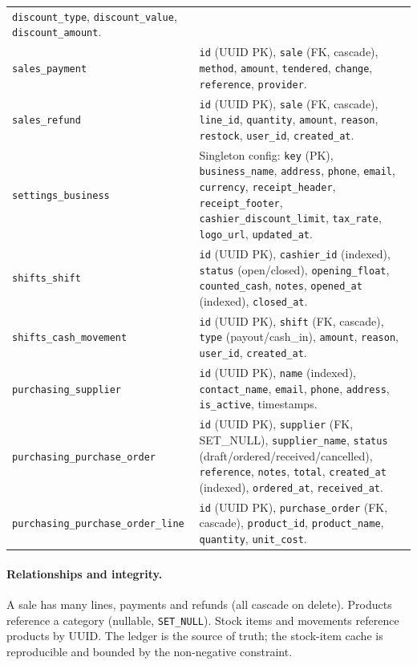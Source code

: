 \documentclass[11pt,a4paper]{article}
\begin{document}
\begin{longtable}{@{}p{}p{}@{}}
\texttt{discount\_type}, \texttt{discount\_value}, \texttt{discount\_amount}. \\[2pt]
\texttt{sales\_payment} & \texttt{id} (UUID PK), \texttt{sale} (FK, cascade), \texttt{method},
\texttt{amount}, \texttt{tendered}, \texttt{change}, \texttt{reference}, \texttt{provider}. \\[2pt]
\texttt{sales\_refund} & \texttt{id} (UUID PK), \texttt{sale} (FK, cascade), \texttt{line\_id},
\texttt{quantity}, \texttt{amount}, \texttt{reason}, \texttt{restock}, \texttt{user\_id},
\texttt{created\_at}. \\[2pt]
\texttt{settings\_business} & Singleton config: \texttt{key} (PK), \texttt{business\_name},
\texttt{address}, \texttt{phone}, \texttt{email}, \texttt{currency}, \texttt{receipt\_header},
\texttt{receipt\_footer}, \texttt{cashier\_discount\_limit}, \texttt{tax\_rate}, \texttt{logo\_url},
\texttt{updated\_at}. \\[2pt]
\texttt{shifts\_shift} & \texttt{id} (UUID PK), \texttt{cashier\_id} (indexed), \texttt{status}
(open/closed), \texttt{opening\_float}, \texttt{counted\_cash}, \texttt{notes}, \texttt{opened\_at}
(indexed), \texttt{closed\_at}. \\[2pt]
\texttt{shifts\_cash\_movement} & \texttt{id} (UUID PK), \texttt{shift} (FK, cascade),
\texttt{type} (payout/cash\_in), \texttt{amount}, \texttt{reason}, \texttt{user\_id},
\texttt{created\_at}. \\[2pt]
\texttt{purchasing\_supplier} & \texttt{id} (UUID PK), \texttt{name} (indexed), \texttt{contact\_name},
\texttt{email}, \texttt{phone}, \texttt{address}, \texttt{is\_active}, timestamps. \\[2pt]
\texttt{purchasing\_purchase\_order} & \texttt{id} (UUID PK), \texttt{supplier} (FK, SET\_NULL),
\texttt{supplier\_name}, \texttt{status} (draft/ordered/received/cancelled), \texttt{reference},
\texttt{notes}, \texttt{total}, \texttt{created\_at} (indexed), \texttt{ordered\_at},
\texttt{received\_at}. \\[2pt]
\texttt{purchasing\_purchase\_order\_line} & \texttt{id} (UUID PK), \texttt{purchase\_order}
(FK, cascade), \texttt{product\_id}, \texttt{product\_name}, \texttt{quantity}, \texttt{unit\_cost}. \\[2pt]

\bottomrule
\end{longtable}

\paragraph{Relationships and integrity.} A sale has many lines, payments and refunds (all cascade on
delete). Products reference a category (nullable, \texttt{SET\_NULL}). Stock items and movements
reference products by UUID. The ledger is the source of truth; the stock-item cache is reproducible
and bounded by the non-negative constraint.
\end{document}
